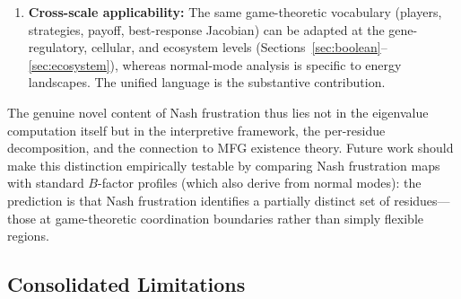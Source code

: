 \documentclass[12pt,a4paper]{article}
\theoremstyle{remark}
\begin{document}
\begin{enumerate}
    \item \textbf{Cross-scale applicability:} The same game-theoretic vocabulary (players, strategies, payoff, best-response Jacobian) can be adapted at the gene-regulatory, cellular, and ecosystem levels (Sections~\ref{sec:boolean}--\ref{sec:ecosystem}), whereas normal-mode analysis is specific to energy landscapes. The unified language is the substantive contribution.
\end{enumerate}

\noindent The genuine novel content of Nash frustration thus lies not in the eigenvalue computation itself but in the interpretive framework, the per-residue decomposition, and the connection to MFG existence theory. Future work should make this distinction empirically testable by comparing Nash frustration maps with standard $B$-factor profiles (which also derive from normal modes): the prediction is that Nash frustration identifies a partially distinct set of residues---those at game-theoretic coordination boundaries rather than simply flexible regions.

\subsection{Consolidated Limitations}
\end{document}
